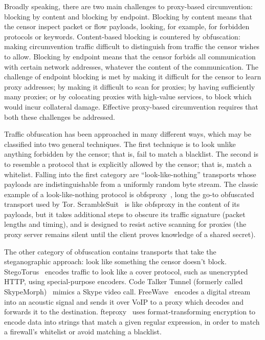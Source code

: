 \documentclass{article}
\begin{document}
Broadly speaking, there are two main challenges to proxy-based circumvention:
blocking by content and blocking by endpoint.
Blocking by content means that the censor inspect packet or flow payloads,
looking, for example, for forbidden protocols or keywords.
Content-based blocking is countered by obfuscation:
making circumvention traffic difficult to distinguish
from traffic the censor wishes to allow.
Blocking by endpoint means that the censor forbids all communication with certain
network addresses, whatever the content of the communication.
The challenge of endpoint blocking is met by making it difficult for the censor to learn proxy addresses;
by making it difficult to scan for proxies;
by having sufficiently many proxies;
or by colocating proxies with high-value services, to block which would incur collateral damage.
Effective proxy-based circumvention requires that both these challenges be addressed.

Traffic obfuscation has been approached in many different ways,
which may be classified into two general techniques.
The first technique is to look unlike
anything forbidden by the censor; that is, fail to match a blacklist. The second is
to resemble a protocol that is explicitly allowed by the censor; that is, match a whitelist.
Falling into the first category are ``look-like-nothing'' transports whose
payloads are indistinguishable from a uniformly random byte stream.
The classic example of a look-like-nothing
protocol is obfsproxy~\cite{obfsproxy}, long the go-to obfuscated
transport used by Tor. ScrambleSuit~\cite{scramblesuit} is like obfsproxy in the
content of its payloads, but it takes additional steps to obscure its traffic signature
(packet lengths and timing), and is designed to resist active scanning for proxies
(the proxy server remains silent until the client proves knowledge of a shared
secret).

The other category of obfuscation contains transports that take the steganographic approach: look like
something the censor doesn't block. StegoTorus~\cite{stegotorus}
encodes traffic to look like a cover protocol, such as unencrypted HTTP,
using special-purpose encoders.
Code Talker
Tunnel (formerly called SkypeMorph)~\cite{skypemorph} mimics a Skype video call.
FreeWave~\cite{freewave} encodes a digital stream into an acoustic signal
and sends it over VoIP to a proxy which decodes and forwards it to the destination.
fteproxy~\cite{fte} uses format-transforming encryption to encode data into strings that match a given regular expression,
in order to match a firewall's whitelist or avoid matching a blacklist.
\end{document}
